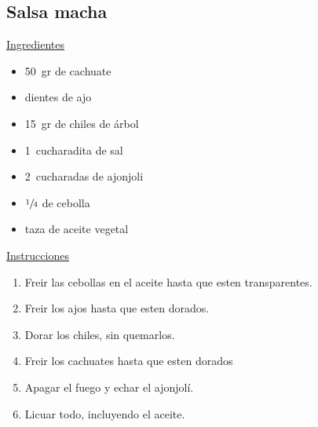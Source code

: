 \subsection{Salsa macha}

\underline{Ingredientes}
\begin{itemize}
\item \SI{50}{gr} de cachuate
\item {} dientes de ajo
\item \SI{15}{gr} de chiles de árbol
\item \SI{1}{cucharadita} de sal
\item \SI{2}{cucharadas} de ajonjoli
\item \Sim $\sfrac{1}{4}$ de cebolla
\item {} taza de aceite vegetal
\end{itemize}

\underline{Instrucciones}
\begin{enumerate}
\item Freir las cebollas en el aceite hasta que esten transparentes.
\item Freir los ajos hasta que esten dorados.
\item Dorar los chiles, sin quemarlos.
\item Freir los cachuates hasta que esten dorados
\item Apagar el fuego y echar el ajonjolí.
\item Licuar todo, incluyendo el aceite. 
\end{enumerate}
